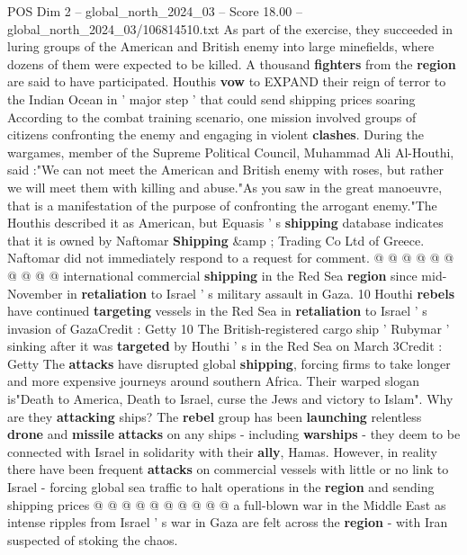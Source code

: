 \begin{textsample}{POS Dim 2 – global\_north\_2024\_03 – Score 18.00 – global\_north\_2024\_03/106814510.txt}  \label{ex:f2_pos_366}
As part of the exercise, they succeeded in luring groups of the American and British enemy into large minefields, where dozens of them were expected to be killed.
A thousand \textbf{fighters} from the \textbf{region} are said to have participated.
Houthis \textbf{vow} to EXPAND their reign of terror to the Indian Ocean in ' major step ' that could send shipping prices soaring According to the combat training scenario, one mission involved groups of citizens confronting the enemy and engaging in violent \textbf{clashes}.
During the wargames, member of the Supreme Political Council, Muhammad Ali Al-Houthi, said :"We can not meet the American and British enemy with roses, but rather we will meet them with killing and abuse."As you saw in the great manoeuvre, that is a manifestation of the purpose of confronting the arrogant enemy."The Houthis described it as American, but Equasis ' s \textbf{shipping} database indicates that it is owned by Naftomar \textbf{Shipping} \&amp ; Trading Co Ltd of Greece.
Naftomar did not immediately respond to a request for comment. @ @ @ @ @ @ @ @ @ @ international commercial \textbf{shipping} in the Red Sea \textbf{region} since mid-November in \textbf{retaliation} to Israel ' s military assault in Gaza. 10 Houthi \textbf{rebels} have continued \textbf{targeting} vessels in the Red Sea in \textbf{retaliation} to Israel ' s invasion of GazaCredit : Getty 10 The British-registered cargo ship ' Rubymar ' sinking after it was \textbf{targeted} by Houthi ' s in the Red Sea on March 3Credit : Getty The \textbf{attacks} have disrupted global \textbf{shipping}, forcing firms to take longer and more expensive journeys around southern Africa.
Their warped slogan is"Death to America, Death to Israel, curse the Jews and victory to Islam".
Why are they \textbf{attacking} ships?
The \textbf{rebel} group has been \textbf{launching} relentless \textbf{drone} and \textbf{missile} \textbf{attacks} on any ships - including \textbf{warships} - they deem to be connected with Israel in solidarity with their \textbf{ally}, Hamas.
However, in reality there have been frequent \textbf{attacks} on commercial vessels with little or no link to Israel - forcing global sea traffic to halt operations in the \textbf{region} and sending shipping prices @ @ @ @ @ @ @ @ @ @ a full-blown war in the Middle East as intense ripples from Israel ' s war in Gaza are felt across the \textbf{region} - with Iran suspected of stoking the chaos.

\end{textsample}
